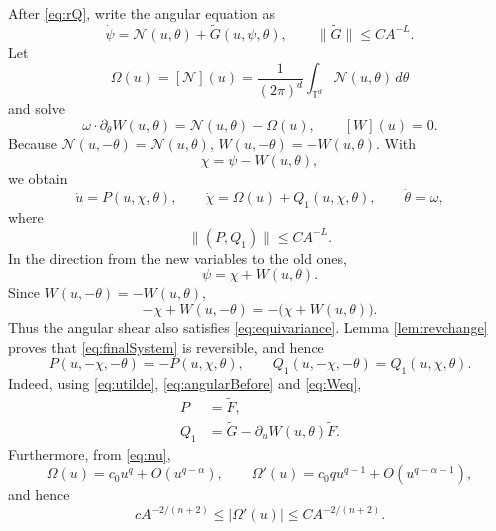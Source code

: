 \documentclass[11pt]{amsart}
\theoremstyle{remark}
\newcommand{\T}{\mathbb T}
\newcommand{\norm}[1]{\lVert #1\rVert}
\begin{document}
After \eqref{eq:rQ}, write the angular equation as
\begin{equation}\label{eq:angularBefore}
 \dot\psi=\mathcal N(u,\theta)+\widetilde G(u,\psi,\theta),
\qquad \norm{\widetilde G}\leq CA^{-L}.
\end{equation}
Let
\[
 \Omega(u)=[\mathcal N](u)
 =\frac1{(2\pi)^d}\int_{\T^d}\mathcal N(u,\theta)\,d\theta
\]
and solve
\begin{equation}\label{eq:Weq}
 \omega\cdot\partial_\theta W(u,\theta)
 =\mathcal N(u,\theta)-\Omega(u),\qquad [W](u)=0.
\end{equation}
Because $\mathcal N(u,-\theta)=\mathcal N(u,\theta)$,
$W(u,-\theta)=-W(u,\theta)$.  With
\begin{equation}\label{eq:chi}
 \chi=\psi-W(u,\theta),
\end{equation}
we obtain
\begin{equation}\label{eq:finalSystem}
 \dot u=P(u,\chi,\theta),\qquad
 \dot\chi=\Omega(u)+Q_1(u,\chi,\theta),\qquad
 \dot\theta=\omega,
\end{equation}
where
\begin{equation}\label{eq:PQsmall}
 \norm{(P,Q_1)}\leq CA^{-L}.
\end{equation}
In the direction from the new variables to the old ones,
\[
 \psi=\chi+W(u,\theta).
\]
Since $W(u,-\theta)=-W(u,\theta)$,
\[
 -\chi+W(u,-\theta)
 =-\bigl(\chi+W(u,\theta)\bigr).
\]
Thus the angular shear also satisfies \eqref{eq:equivariance}.
Lemma \ref{lem:revchange} proves that \eqref{eq:finalSystem} is reversible,
and hence
\begin{equation}\label{eq:finalPQparity}
 P(u,-\chi,-\theta)=-P(u,\chi,\theta),\qquad
 Q_1(u,-\chi,-\theta)=Q_1(u,\chi,\theta).
\end{equation}
Indeed, using \eqref{eq:utilde}, \eqref{eq:angularBefore} and
\eqref{eq:Weq},
\begin{align}
 P&=\widetilde F,\label{eq:Pexact}\\
 Q_1&=\widetilde G
 -\partial_uW(u,\theta)\widetilde F.
\label{eq:Q1exact}
\end{align}
Furthermore, from \eqref{eq:nu},
\begin{equation}\label{eq:twist}
 \Omega(u)=c_0u^q+O(u^{q-\alpha}),\qquad
 \Omega'(u)=c_0qu^{q-1}
 +O(u^{q-\alpha-1}),
\end{equation}
and hence
\begin{equation}\label{eq:twistbound}
 cA^{-2/(n+2)}
 \leq|\Omega'(u)|
 \leq CA^{-2/(n+2)}.
\end{equation}
\end{document}
